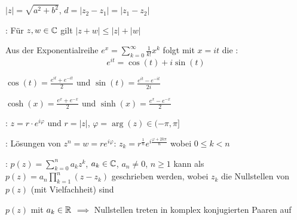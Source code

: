 \Def {} $|z| = \sqrt{a^2 + b^2}$,
 $d = |z_2 - z_1| = |z_1 - z_2|$

\Satz {}: Für $z, w \in \mathbb{C}$ gilt $|z + w|\le |z| + |w|$

\Satz Aus der Exponentialreihe $e^x = \sum_{k=0}^{\infty}\frac{1}{k!}x^k$ folgt mit $x = it$
die :
$$e^{it} = \cos(t) + i\sin(t)$$

\Kor $\cos(t) = \frac{e^{it} + e^{-it}}{2}$ und $\sin(t) = \frac{e^{it} - e^{-it}}{2i}$

\Def $\cosh(x) = \frac{e^x + e^{-x}}{2}$ und $\sinh(x) = \frac{e^x - e^{-x}}{2}$

\Def {}: $z = r \cdot e^{i\varphi}$ und $r = |z|$, $\varphi = \arg(z) \in (-\pi, \pi]$

\Satz {}: Lösungen von $z^n = w = re^{i\varphi}$:
$z_k = r^{\frac{1}{n}}e^{i\frac{\varphi + 2k\pi}{n}}$ wobei $0\le k < n$

\Satz {}: $p(z) = \sum_{k=0}^{n} a_k z^k$, $a_k \in \mathbb{C}$, $a_n \ne 0$, $n\ge 1$
kann als $p(z) = a_n\prod_{k=1}^{n}(z-z_k)$ geschrieben werden, wobei $z_k$ die Nullstellen
von $p(z)$ (mit Vielfachheit) sind

\Satz $p(z)$ mit $a_k \in \mathbb{R}$ $\implies$ Nullstellen treten in komplex konjugierten Paaren auf